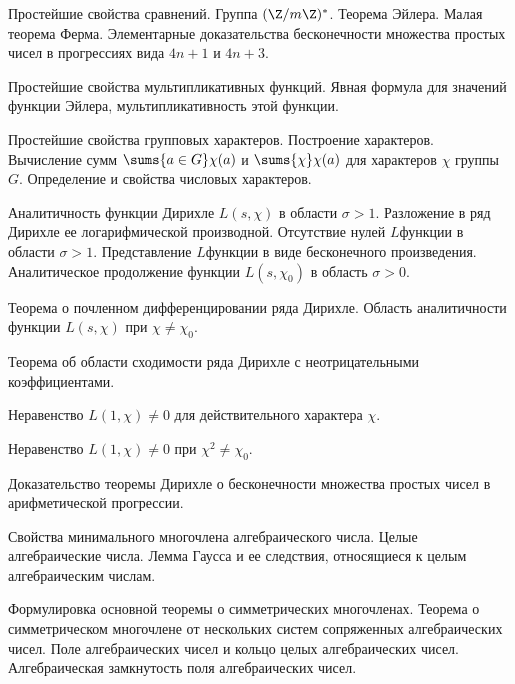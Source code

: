 \documentclass[a4paper,draft]{article}
\begin{document}
\begin{nums}{0}
\item Простейшие свойства сравнений. Группа  $(\Z/m\Z)^*$. Теорема
Эйлера. Малая теорема Ферма. Элементарные доказательства
бесконечности множества простых чисел в прогрессиях вида  $4n+1$ и
$4n+3$.

\item Простейшие свойства мультипликативных функций. Явная формула
для значений функции Эйлера,  мультипликативность этой функции.

\item Простейшие свойства групповых характеров. Построение
характеров. Вычисление сумм  $\sums{a \in G} \chi (a)$ и
$\sums{\chi} \chi (a)$ для характеров $\chi$
 группы $G$. Определение и свойства числовых характеров.

\item Аналитичность функции Дирихле $L(s, \chi)$   в области
$\sigma >1$. Разложение в ряд Дирихле ее логарифмической
производной. Отсутствие нулей $L$\д функции  в области
$\sigma >1$. Представление $L$\д функции в виде бесконечного произведения.
Аналитическое продолжение функции  $L(s, \chi_0)$ в область
$\sigma >0$.

\item Теорема о почленном дифференцировании ряда Дирихле. Область
аналитичности функции  $L(s, \chi)$  при $\chi \ne \chi_0$.

\item Теорема об области сходимости ряда Дирихле с неотрицательными
коэффициентами.

\item Неравенство $L(1, \chi ) \ne 0$   для действительного
характера $\chi$.

\item Неравенство $L(1, \chi ) \ne 0$   при $\chi^2 \ne \chi_0$.

\item Доказательство теоремы Дирихле о бесконечности множества
простых чисел в арифметической прогрессии.

\item Свойства минимального многочлена алгебраического числа. Целые
алгебраические числа. Лемма Гаусса и ее следствия, относящиеся к
целым алгебраическим числам.

\item Формулировка основной теоремы о симметрических многочленах.
Теорема о симметрическом многочлене от нескольких систем
сопряженных алгебраических чисел. Поле алгебраических чисел и
кольцо целых алгебраических чисел. Алгебраическая замкнутость поля
алгебраических чисел.


\end{nums}
\end{document}
